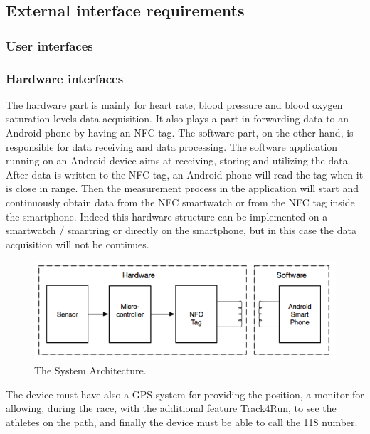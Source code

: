\subsection{External interface requirements}
\subsubsection{User interfaces}


\subsubsection{Hardware interfaces}
The hardware part is mainly for heart rate, blood pressure and blood oxygen saturation levels data acquisition. It also plays a part in forwarding data to an Android phone by having an NFC tag. The software part, on the other hand, is responsible for data receiving and data processing. The software application running on an Android device aims at receiving, storing and utilizing the data. After data is written to the NFC tag, an Android phone will read the tag when it is close in range. Then the measurement process in the application will start and continuously obtain data from the NFC smartwatch or from the NFC tag inside the smartphone. Indeed this hardware structure can be implemented on a smartwatch / smartring or directly on the smartphone, but in this case the data acquisition will not be continues.
\begin{figure}[h!]
  \includegraphics[width=\linewidth]{Images/hardware}
  \caption{The System Architecture.}
  \label{fig:The System Architecture}
\end{figure} 
The device must have also a GPS system for providing the position, a monitor for allowing, during the race, with the additional feature Track4Run, to see the athletes on the path, and finally the device must be able to call the 118 number.

